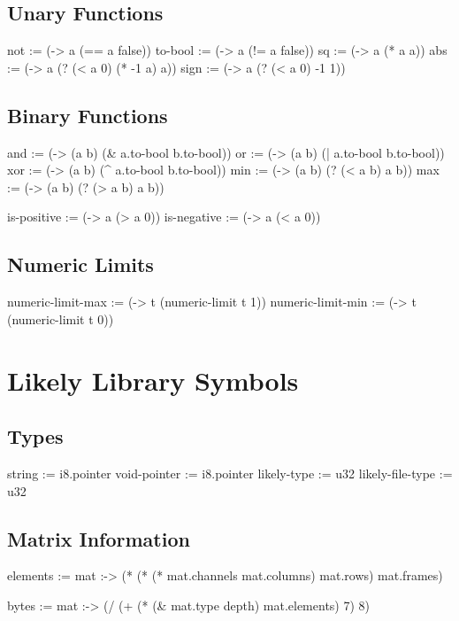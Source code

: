 \documentclass[twoside=false, numbers=noenddot]{scrbook}
\newenvironment{likely}
{ \verbatim }
{ \endverbatim }
\begin{document}
\section{Unary Functions}
\begin{likely}
not     := (-> a (== a false))
to-bool := (-> a (!= a false))
sq      := (-> a (* a a))
abs     := (-> a (? (< a 0) (* -1 a) a))
sign    := (-> a (? (< a 0) -1 1))
\end{likely}

\section{Binary Functions}
\begin{likely}
and := (-> (a b) (& a.to-bool b.to-bool))
or  := (-> (a b) (| a.to-bool b.to-bool))
xor := (-> (a b) (^ a.to-bool b.to-bool))
min := (-> (a b) (? (< a b) a b))
max := (-> (a b) (? (> a b) a b))

is-positive := (-> a (> a 0))
is-negative := (-> a (< a 0))
\end{likely}

\section{Numeric Limits}
\begin{likely}
numeric-limit-max := (-> t (numeric-limit t 1))
numeric-limit-min := (-> t (numeric-limit t 0))
\end{likely}

\chapter{Likely Library Symbols}
\section{Types}
\begin{likely}
string       := i8.pointer
void-pointer := i8.pointer
likely-type      := u32
likely-file-type := u32
\end{likely}

\section{Matrix Information}
\begin{likely}
elements :=
  mat :->
    (* (* (* mat.channels mat.columns) mat.rows) mat.frames)

bytes :=
  mat :->
    (/ (+ (* (& mat.type depth) mat.elements) 7) 8)
\end{likely}
\end{document}
